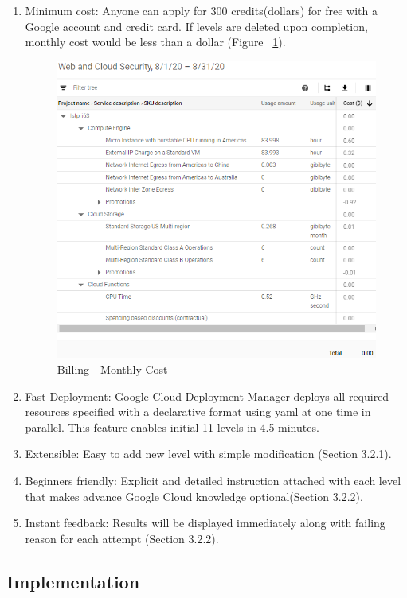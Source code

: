 \documentclass[sigconf]{acmart}
\begin{document}
\begin{enumerate}
\item Minimum cost: Anyone can apply for 300 credits(dollars) for free with a Google account and credit card. If levels are deleted upon completion, monthly cost would be less than a dollar (Figure ~\ref{fig:cost}). 
\begin{figure}[h]
  \centering
  \includegraphics[width=\linewidth]{cost}
  \caption {Billing - Monthly Cost}
  \label{fig:cost}
\end{figure}
\item Fast Deployment: Google Cloud Deployment Manager deploys all required resources specified with a declarative format using yaml at one time in parallel. This feature enables initial 11 levels in 4.5 minutes.
\item Extensible: Easy to add new level with simple modification (Section 3.2.1).
\item Beginners friendly: Explicit and detailed instruction attached with each level that makes advance Google Cloud knowledge optional(Section 3.2.2).
\item Instant feedback: Results will be displayed immediately along with failing reason for each attempt (Section 3.2.2).

\end{enumerate}

\subsection{Implementation}
\end{document}
